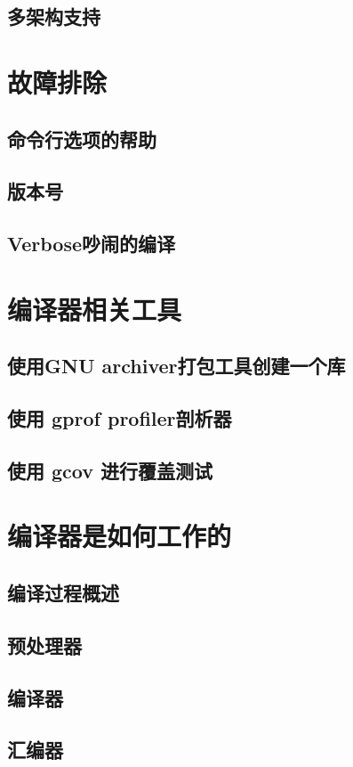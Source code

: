 \documentclass[lang=cn,12pt,newtx,scheme=chinese]{elegantbook}
\begin{document}
\section{多架构支持}

\chapter{故障排除}
\section{命令行选项的帮助}
\section{版本号}
\section{Verbose吵闹的编译}

\chapter{编译器相关工具}
\section{使用GNU archiver打包工具创建一个库}
\section{使用 gprof profiler剖析器}
\section{使用 gcov 进行覆盖测试}

\chapter{编译器是如何工作的}
\section{编译过程概述}
\section{预处理器}
\section{编译器}
\section{汇编器}
\end{document}
